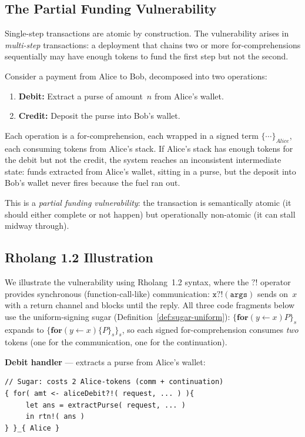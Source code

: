 \documentclass[11pt,a4paper]{article}
\newcommand{\forc}{\mathbf{for}}
\newcommand{\recv}[3]{\forc\!\left( #1 \leftarrow #2 \right) #3}
\newcommand{\signed}[2]{\{#1\}_{#2}}
\begin{document}
\subsection{The Partial Funding Vulnerability}
\label{sec:partial-funding}

Single-step transactions are atomic by construction.  The
vulnerability arises in \emph{multi-step} transactions: a
deployment that chains two or more for-comprehensions
sequentially may have enough tokens to fund the first step
but not the second.

Consider a payment from Alice to Bob, decomposed into two
operations:

\begin{enumerate}[nosep]
  \item \textbf{Debit:}  Extract a purse of amount~$n$ from
    Alice's wallet.
  \item \textbf{Credit:}  Deposit the purse into Bob's wallet.
\end{enumerate}

\noindent
Each operation is a for-comprehension, each wrapped in a
signed term $\signed{\cdots}{\mathit{Alice}}$, each consuming
tokens from Alice's stack.  If Alice's stack has enough tokens
for the debit but not the credit, the system reaches an
inconsistent intermediate state: funds extracted from Alice's
wallet, sitting in a purse, but the deposit into Bob's wallet
never fires because the fuel ran out.

This is a \emph{partial funding vulnerability}: the
transaction is semantically atomic (it should either complete
or not happen) but operationally non-atomic (it can stall
midway through).

\subsection{Rholang 1.2 Illustration}
\label{sec:rholang-illustration}

We illustrate the vulnerability using Rholang~1.2 syntax,
where the $\mathtt{?!}$ operator provides synchronous
(function-call-like) communication: $\mathtt{x?!(args)}$ sends
on~$x$ with a return channel and blocks until the reply.
All three code fragments below use the uniform-signing sugar
(Definition~\ref{def:sugar-uniform}):
$\signed{\recv{y}{x}{P}}{s}$ expands to
$\signed{\recv{y}{x}{\signed{P}{s}}}{s}$, so each signed
for-comprehension consumes \emph{two} tokens (one for the
communication, one for the continuation).

\medskip
\noindent
\textbf{Debit handler} --- extracts a purse from Alice's
wallet:
\begin{lstlisting}[style=rholang]
// Sugar: costs 2 Alice-tokens (comm + continuation)
{ for( amt <- aliceDebit?!( request, ... ) ){
     let ans = extractPurse( request, ... )
     in rtn!( ans )
} }_{ Alice }
\end{lstlisting}
\end{document}
